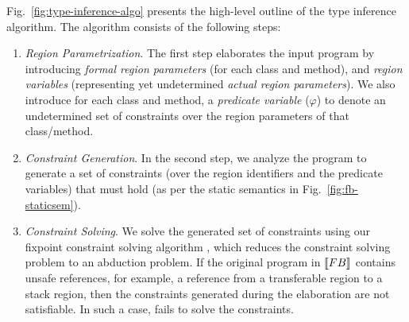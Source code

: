 Fig.~\ref{fig:type-inference-algo} presents the high-level outline of the type
inference algorithm.
The algorithm consists of the following steps:
\begin{enumerate}
 \item \emph{Region Parametrization}.
   The first step elaborates the input program by introducing \emph{formal region parameters}
   (for each class and method), and \emph{region variables} (representing yet undetermined
   \emph{actual region parameters}). We also introduce for each class and method, a
   \emph{predicate variable} ($\varphi$) to denote an undetermined set of constraints
   over the region parameters of that class/method.


 \item \emph{Constraint Generation}.
   In the second step, we analyze the program to generate a set of constraints
   (over the region identifiers and the predicate variables)
   that must hold (as per the static semantics in Fig.~\ref{fig:fb-staticsem}).

 \item \emph{Constraint Solving}.
   We solve the generated set of constraints using our fixpoint constraint
   solving algorithm \csolvestar, which reduces the constraint solving problem to
   an abduction problem. If the original program in $\llbracket {\sc FB} \rrbracket$ contains unsafe
   references, for example, a reference from a transferable region to a
   stack region, then the constraints generated during the elaboration
   are not satisfiable. In such a case, \csolvestar{} fails to solve
   the constraints.


\end{enumerate}
